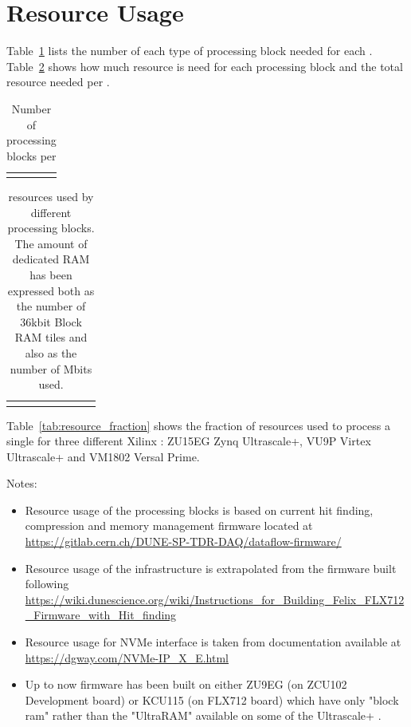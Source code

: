 \documentclass{article}
\begin{document}
\section{Resource Usage}

Table~\ref{tab:block_numbers} lists the number of each type of processing block needed for each . Table~\ref{tab:block_resource_usage} shows how much  resource is need for each processing block and the total resource needed per .

\begin{table}[ht]
\begin{tabular}{l l}
\end{tabular}
\caption{Number of processing blocks per }
\label{tab:block_numbers}
\end{table}

\begin{table}[ht]
\begin{tabular}{p{2.2cm}  |p{1.5cm}| p{1.3cm}| p{1.3cm} |p{1.3cm} |p{1.5cm} |p{1.3cm}| p{1.5cm}}
\end{tabular}
\caption{ resources used by different processing blocks. The amount of dedicated RAM has been expressed both as the number of 36kbit Block RAM tiles and also as the number of Mbits used.}
\label{tab:block_resource_usage}
\end{table}

Table~\ref{tab:resource_fraction} shows the fraction of resources used to process a single  for three different Xilinx : ZU15EG Zynq Ultrascale+, VU9P Virtex Ultrascale+ and VM1802 Versal Prime. 

Notes:

\begin{itemize}
    \item Resource usage of the processing blocks is based on current hit finding, compression and memory management firmware located at \url{https://gitlab.cern.ch/DUNE-SP-TDR-DAQ/dataflow-firmware/}
    \item Resource usage of the  infrastructure is extrapolated from the firmware built following \url{https://wiki.dunescience.org/wiki/Instructions_for_Building_Felix_FLX712_Firmware_with_Hit_finding}
    \item Resource usage for NVMe interface is taken from documentation available at \url{https://dgway.com/NVMe-IP_X_E.html}
    \item Up to now firmware has been built on either ZU9EG (on ZCU102 Development board) or KCU115 (on FLX712  board) which have only "block ram" rather than the "UltraRAM" available on some of the Ultrascale+ .
\end{itemize}
\end{document}
